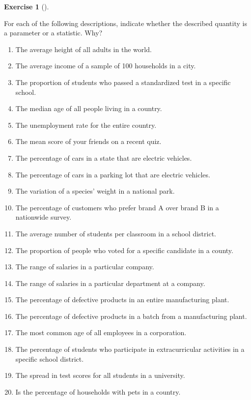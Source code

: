 \documentclass[
  letterpaper,
  DIV=11,
  numbers=noendperiod]{scrreprt}
\providecommand{\tightlist}{%
  \setlength{\itemsep}{0pt}\setlength{\parskip}{0pt}}\usepackage{longtable,booktabs,array}
\theoremstyle{definition}
\newtheorem{exercise}{Exercise}[chapter]
\theoremstyle{definition}
\theoremstyle{definition}
\theoremstyle{remark}
\begin{document}
\begin{exercise}[]\protect\hypertarget{exr-10.3}{}\label{exr-10.3}

For each of the following descriptions, indicate whether the described
quantity is a parameter or a statistic. Why?

\begin{enumerate}
\def\labelenumi{\alph{enumi}.}
\tightlist
\item
  The average height of all adults in the world.
\item
  The average income of a sample of 100 households in a city.
\item
  The proportion of students who passed a standardized test in a
  specific school.
\item
  The median age of all people living in a country.
\item
  The unemployment rate for the entire country.
\item
  The mean score of your friends on a recent quiz.
\item
  The percentage of cars in a state that are electric vehicles.
\item
  The percentage of cars in a parking lot that are electric vehicles.
\item
  The variation of a species' weight in a national park.
\item
  The percentage of customers who prefer brand A over brand B in a
  nationwide survey.
\item
  The average number of students per classroom in a school district.
\item
  The proportion of people who voted for a specific candidate in a
  county.
\item
  The range of salaries in a particular company.
\item
  The range of salaries in a particular department at a company.
\item
  The percentage of defective products in an entire manufacturing plant.
\item
  The percentage of defective products in a batch from a manufacturing
  plant.
\item
  The most common age of all employees in a corporation.
\item
  The percentage of students who participate in extracurricular
  activities in a specific school district.
\item
  The spread in test scores for all students in a university.
\item
  Is the percentage of households with pets in a country.
\end{enumerate}

\end{exercise}
\end{document}
